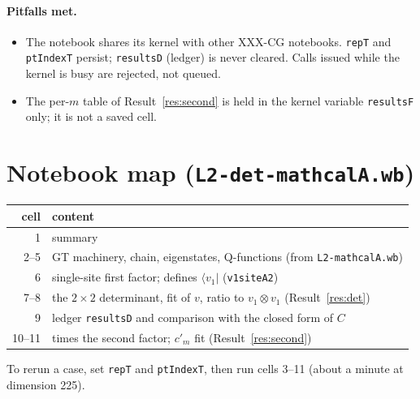 \documentclass[11pt]{article}
\newcommand{\nb}[1]{\texttt{#1}}
\theoremstyle{definition}
\theoremstyle{remark}
\begin{document}
\paragraph{Pitfalls met.}
\begin{itemize}
\item The notebook shares its kernel with other XXX-CG notebooks. \nb{repT} and \nb{ptIndexT} persist; \nb{resultsD} (ledger) is never cleared. Calls issued while the kernel is busy are rejected, not queued.
\item The per-$m$ table of Result~\ref{res:second} is held in the kernel variable \nb{resultsF} only; it is not a saved cell.
\end{itemize}

\section*{Notebook map (\nb{L2-det-mathcalA.wb})}
\begin{center}
\begin{tabular}{rl}\toprule
cell & content\\\midrule
1 & summary\\
2--5 & GT machinery, chain, eigenstates, Q-functions (from \nb{L2-mathcalA.wb})\\
6 & single-site first factor; defines $\langle v_1|$ (\nb{v1siteA2})\\
7--8 & the $2\times2$ determinant, fit of $v$, ratio to $v_1\otimes v_1$ (Result~\ref{res:det})\\
9 & ledger \nb{resultsD} and comparison with the closed form of $C$\\
10--11 & times the second factor; $c'_m$ fit (Result~\ref{res:second})\\\bottomrule
\end{tabular}
\end{center}
To rerun a case, set \nb{repT} and \nb{ptIndexT}, then run cells 3--11 (about a minute at dimension 225).
\end{document}
